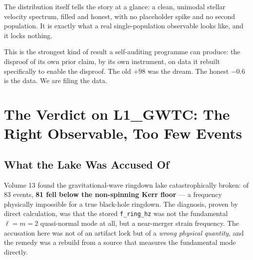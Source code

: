 \documentclass[11pt, letterpaper, openany]{book}
\begin{document}
The distribution itself tells the story at a glance: a clean, unimodal stellar velocity
spectrum, filled and honest, with no placeholder spike and no second population. It is exactly
what a real single-population observable looks like, and it locks nothing.

\begin{warningbox}
This is the strongest kind of result a self-auditing programme can produce: the disproof of its
own prior claim, by its own instrument, on data it rebuilt specifically to enable the disproof.
The old $+98$ was the dream. The honest $-0.6$ is the data. We are filing the data.
\end{warningbox}

\chapter{The Verdict on L1\_GWTC: The Right Observable, Too Few Events}

\section{What the Lake Was Accused Of}

Volume 13 found the gravitational-wave ringdown lake catastrophically broken: of 83 events,
\textbf{81 fell below the non-spinning Kerr floor} --- a frequency physically impossible for a
true black-hole ringdown. The diagnosis, proven by direct calculation, was that the stored
\texttt{f\_ring\_hz} was not the fundamental $\ell=m=2$ quasi-normal mode at all, but a
near-merger strain frequency. The accusation here was not of an artifact lock but of a
\emph{wrong physical quantity}, and the remedy was a rebuild from a source that measures the
fundamental mode directly.
\end{document}
